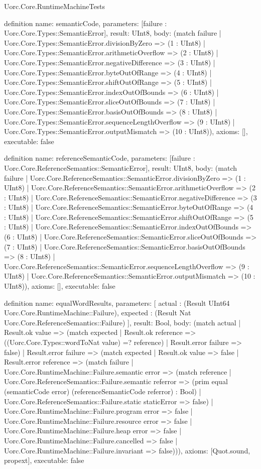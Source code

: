 \begin{lexlean}{Uorc.Core.RuntimeMachineTests}
\begin{semanticmodule}
definition{
  name: semanticCode,
  parameters: [failure : Uorc.Core.Types::SemanticError],
  result: UInt8,
  body: (match failure
    | Uorc.Core.Types::SemanticError.divisionByZero => (1 : UInt8)
    | Uorc.Core.Types::SemanticError.arithmeticOverflow => (2 : UInt8)
    | Uorc.Core.Types::SemanticError.negativeDifference => (3 : UInt8)
    | Uorc.Core.Types::SemanticError.byteOutOfRange => (4 : UInt8)
    | Uorc.Core.Types::SemanticError.shiftOutOfRange => (5 : UInt8)
    | Uorc.Core.Types::SemanticError.indexOutOfBounds => (6 : UInt8)
    | Uorc.Core.Types::SemanticError.sliceOutOfBounds => (7 : UInt8)
    | Uorc.Core.Types::SemanticError.basisOutOfBounds => (8 : UInt8)
    | Uorc.Core.Types::SemanticError.sequenceLengthOverflow => (9 : UInt8)
    | Uorc.Core.Types::SemanticError.outputMismatch => (10 : UInt8)),
  axioms: [],
  executable: false
}

definition{
  name: referenceSemanticCode,
  parameters: [failure : Uorc.Core.ReferenceSemantics::SemanticError],
  result: UInt8,
  body: (match failure
    | Uorc.Core.ReferenceSemantics::SemanticError.divisionByZero => (1 : UInt8)
    | Uorc.Core.ReferenceSemantics::SemanticError.arithmeticOverflow => (2 : UInt8)
    | Uorc.Core.ReferenceSemantics::SemanticError.negativeDifference => (3 : UInt8)
    | Uorc.Core.ReferenceSemantics::SemanticError.byteOutOfRange => (4 : UInt8)
    | Uorc.Core.ReferenceSemantics::SemanticError.shiftOutOfRange => (5 : UInt8)
    | Uorc.Core.ReferenceSemantics::SemanticError.indexOutOfBounds => (6 : UInt8)
    | Uorc.Core.ReferenceSemantics::SemanticError.sliceOutOfBounds => (7 : UInt8)
    | Uorc.Core.ReferenceSemantics::SemanticError.basisOutOfBounds => (8 : UInt8)
    | Uorc.Core.ReferenceSemantics::SemanticError.sequenceLengthOverflow => (9 : UInt8)
    | Uorc.Core.ReferenceSemantics::SemanticError.outputMismatch => (10 : UInt8)),
  axioms: [],
  executable: false
}

definition{
  name: equalWordResults,
  parameters: [
    actual : (Result UInt64 Uorc.Core.RuntimeMachine::Failure),
    expected : (Result Nat Uorc.Core.ReferenceSemantics::Failure)
  ],
  result: Bool,
  body: (match actual
    | Result.ok value => (match expected
      | Result.ok reference => ((Uorc.Core.Types::wordToNat value) =? reference)
      | Result.error failure => false)
    | Result.error failure => (match expected
      | Result.ok value => false
      | Result.error reference => (match failure
        | Uorc.Core.RuntimeMachine::Failure.semantic error => (match reference
          | Uorc.Core.ReferenceSemantics::Failure.semantic referror => (prim equal (semanticCode error) (referenceSemanticCode referror) : Bool)
          | Uorc.Core.ReferenceSemantics::Failure.static staticError => false)
        | Uorc.Core.RuntimeMachine::Failure.program error => false
        | Uorc.Core.RuntimeMachine::Failure.resource error => false
        | Uorc.Core.RuntimeMachine::Failure.heap error => false
        | Uorc.Core.RuntimeMachine::Failure.cancelled => false
        | Uorc.Core.RuntimeMachine::Failure.invariant => false))),
  axioms: [Quot.sound, propext],
  executable: false
}


\end{semanticmodule}
\end{lexlean}
